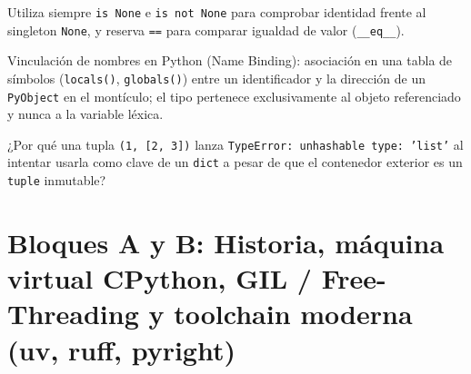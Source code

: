 \documentclass{book}
\begin{document}
\begin{tcolorbox}[title={Consejo}, studiumtip, breakable]

Utiliza siempre \texttt{is None} e \texttt{is not None} para comprobar identidad frente al singleton \texttt{None}, y reserva \texttt{==} para comparar igualdad de valor (\texttt{\_\_eq\_\_}).
\end{tcolorbox}

\begin{tcolorbox}[title={Definición}, studiumdef, breakable]

Vinculación de nombres en Python (Name Binding): asociación en una tabla de símbolos (\texttt{locals()}, \texttt{globals()}) entre un identificador y la dirección de un \texttt{PyObject} en el montículo; el tipo pertenece exclusivamente al objeto referenciado y nunca a la variable léxica.
\end{tcolorbox}

\begin{tcolorbox}[title={Autoficha}, studiumcheck, breakable]

¿Por qué una tupla \texttt{(1, [2, 3])} lanza \texttt{TypeError: unhashable type: 'list'} al intentar usarla como clave de un \texttt{dict} a pesar de que el contenedor exterior es un \texttt{tuple} inmutable?
\end{tcolorbox}

\section{Bloques A y B: Historia, máquina virtual CPython, GIL / Free-Threading y toolchain moderna (uv, ruff, pyright)}
\end{document}

